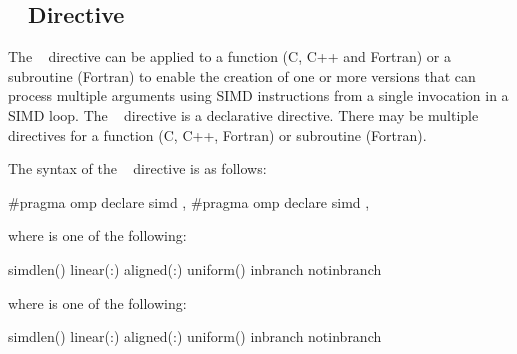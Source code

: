 \subsection{~ Directive}
\label{subsec:declare simd Directive}
\summary
The ~ directive can be applied to a function (C, C++ and Fortran) or a
subroutine (Fortran) to enable the creation of one or more versions that can process
multiple arguments using SIMD instructions from a single invocation in a SIMD
loop. The ~ directive is a declarative directive. There may be multiple
~ directives for a function (C, C++, Fortran) or subroutine (Fortran).

\syntax
The syntax of the ~ directive is as follows:

\begin{ccppspecific}
\begin{ompcPragma}
#pragma omp declare simd \plc{[clause[ [},\plc{] clause] ... ] new-line}
\plc{[}#pragma omp declare simd \plc{[clause[ [},\plc{] clause] ... ] new-line]}
\plc{[ ... ]}
\end{ompcPragma}

where  is one of the following:

\begin{indentedcodelist}
simdlen()
linear(\plc{linear-list[ }:\plc{ linear-step]})
aligned(\plc{argument-list[ }:\plc{ alignment]})
uniform()
inbranch
notinbranch
\end{indentedcodelist}
\end{ccppspecific}


\begin{fortranspecific}

where  is one of the following:
\begin{indentedcodelist}
simdlen()
linear(\plc{linear-list[ }:\plc{ linear-step]})
aligned(\plc{argument-list[ }:\plc{ alignment]})
uniform()
inbranch
notinbranch
\end{indentedcodelist}
\end{fortranspecific}


